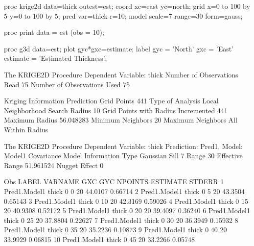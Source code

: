 \documentclass{article}
\begin{document}
\begin{Winput}
proc krige2d data=thick outest=est; 
  coord xc=east yc=north; 
  grid x=0 to 100 by 5 y=0 to 100 by 5; 
  pred var=thick r=10; 
  model scale=7 range=30 form=gauss; 

proc print data = est (obs = 10); 

proc g3d data=est;
  plot gyc*gxc=estimate;
  label gyc      = 'North' 
        gxc      = 'East' 
        estimate = 'Estimated Thickness'; 
\end{Winput}
\begin{Woutput}
The KRIGE2D Procedure
Dependent Variable: thick
Number of Observations Read          75
Number of Observations Used          75

                  Kriging Information
Prediction Grid Points                               441
Type of Analysis                                   Local
Neighborhood Search Radius                            10
Grid Points with Radius Incremented                  441
Maximum Radius                                 56.048283
Minimum Neighbors                                     20
Maximum Neighbors                      All Within Radius

The KRIGE2D Procedure
Dependent Variable: thick
Prediction: Pred1, Model: Model1
Covariance Model Information
Type                Gaussian
Sill                       7
Range                     30
Effective Range    51.961524
Nugget Effect              0

Obs     LABEL      VARNAME  GXC  GYC  NPOINTS  ESTIMATE   STDERR
  1  Pred1.Model1   thick    0     0     20     44.0107  0.66714
  2  Pred1.Model1   thick    0     5     20     43.3504  0.65143
  3  Pred1.Model1   thick    0    10     20     42.3169  0.59026
  4  Pred1.Model1   thick    0    15     20     40.9308  0.52172
  5  Pred1.Model1   thick    0    20     20     39.4097  0.36240
  6  Pred1.Model1   thick    0    25     20     37.8804  0.22627
  7  Pred1.Model1   thick    0    30     20     36.3949  0.15932
  8  Pred1.Model1   thick    0    35     20     35.2236  0.10873
  9  Pred1.Model1   thick    0    40     20     33.9929  0.06815
 10  Pred1.Model1   thick    0    45     20     33.2266  0.05748
\end{Woutput}
\end{document}
